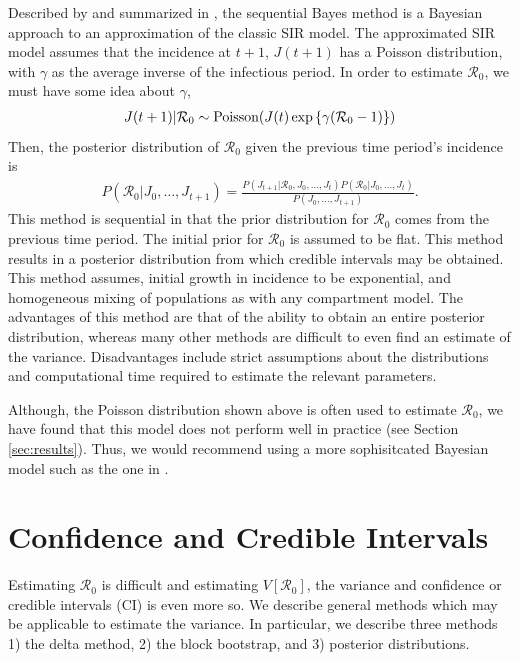\documentclass[12pt]{article}
\newcommand{\rr}{\ensuremath{\mathcal{R}_0}}
\begin{document}
Described by \cite{bettencourt2008} and summarized in \cite{obadia2012r0}, the sequential Bayes method is a Bayesian approach to an approximation of the classic SIR model.  The approximated SIR model assumes that the incidence at $t+1$, $J(t+1)$ has a Poisson distribution, with $\gamma$ as the  average inverse of the infectious period. In order to estimate $\rr$, we must have some idea about $\gamma$,
\begin{align*}
J(t+1) | \rr  \sim \textnormal{Poisson}( J(t) \exp \left \{  \gamma (\rr-1)\right \})
\end{align*}
Then, the posterior distribution of $\rr$ given the previous time period's incidence is
\begin{align*}
  P(\rr | J_0, \dots, J_{t+1}) = \frac{P(J_{t+1} | \rr, J_0, \dots, J_t)P(\rr| J_0, \dots, J_t)}{P(J_0, \dots, J_{t+1})}.
\end{align*}
This method is sequential in that the prior distribution for $\rr$ comes from the previous time period.  The initial prior for $\rr$ is assumed to be flat.  This method results in a posterior distribution from which credible intervals may be obtained.  This method assumes, initial growth in incidence to be exponential, and homogeneous mixing of populations as with any compartment model.  The advantages of this method are that of the ability to obtain an entire posterior distribution, whereas many other methods are difficult to even find an estimate of the variance.  Disadvantages include strict assumptions about the distributions and computational time required to estimate the relevant parameters.

Although, the Poisson distribution shown above is often used to estimate $\rr$, we have found that this model does not perform well in practice (see Section \ref{sec:results}).  Thus, we would recommend using a more sophisitcated Bayesian model such as the one in \cite{bauer2017}.


\section{Confidence and Credible Intervals}
\label{sec:ci}

Estimating $\rr$ is difficult and estimating $V[\rr]$, the variance and confidence or credible intervals (CI) is even more so.  We describe general methods which may be applicable to estimate the variance.  In particular, we describe three methods 1) the delta method, 2) the block bootstrap, and 3) posterior distributions.
\end{document}
